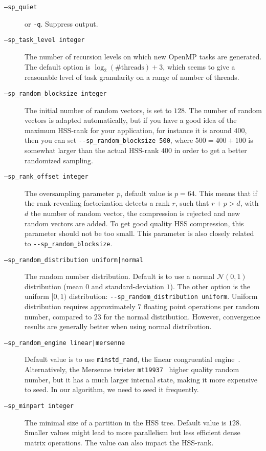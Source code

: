 \documentclass{article}
\begin{document}
\begin{description}
\item[\texttt{---sp\_quiet}] or \lstinline[style=Bash]!-q!. Suppress
  output.
\item[\texttt{---sp\_task\_level integer}] The number of recursion
  levels on which new OpenMP tasks are generated. The default option
  is $\log_2(\#\textrm{threads}) +3$, which seems to give a reasonable
  level of task granularity on a range of number of threads.
\item[\texttt{---sp\_random\_blocksize integer}] The initial number of random
  vectors, is set to $128$. The number of random vectors is adapted
  automatically, but if you have a good idea of the maximum HSS-rank
  for your application, for instance it is around $400$, then you can
  set \lstinline[style=Bash]!--sp_random_blocksize 500!, where $500 =
  400 + 100$ is somewhat larger than the actual HSS-rank $400$ in
  order to get a better randomized sampling.
\item[\texttt{---sp\_rank\_offset integer}] The oversampling parameter $p$,
  default value is $p = 64$. This means that if the rank-revealing
  factorization detects a rank $r$, such that $r + p > d$, with $d$
  the number of random vector, the compression is rejected and new
  random vectors are added. To get good quality HSS compression, this
  parameter should not be too small. This parameter is also closely
  related to \lstinline[style=Bash]!--sp_random_blocksize!.
\item[\texttt{---sp\_random\_distribution uniform|normal}] The random number
  distribution. Default is to use a normal $\mathcal{N}(0,1)$
  distribution (mean $0$ and standard-deviation $1$). The other option
  is the uniform $[0,1)$ distribution:
  \lstinline[style=Bash]!--sp_random_distribution uniform!. Uniform
  distribution requires approximately $7$ floating point operations
  per random number, compared to $23$ for the normal
  distribution. However, convergence results are generally better when
  using normal distribution.
\item[\texttt{---sp\_random\_engine linear|mersenne}] Default value is
  to use \verb$minstd_rand$, the linear congruential
  engine~\cite{park1993remarks}. Alternatively, the Mersenne twister
  \verb$mt19937$~\cite{matsumoto1998mersenne} higher quality random
  number, but it has a much larger internal state, making it more
  expensive to seed. In our algorithm, we need to seed it frequently.
\item[\texttt{---sp\_minpart integer}] The minimal size of a partition
  in the HSS tree. Default value is $128$. Smaller values might lead
  to more parallelism but less efficient dense matrix operations. The
  value can also impact the HSS-rank.
\end{description}
\end{document}
